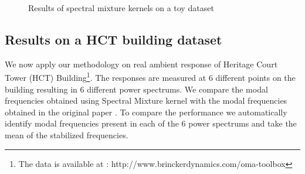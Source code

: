\begin{figure}[!ht]
  \centering
  \quad
    \quad
  
  \caption{Results of spectral mixture kernels on a toy dataset}
\end{figure}

\subsection{Results on a HCT building dataset}
We now apply our methodology on real ambient response of Heritage Court Tower (HCT) Building\footnote{The data is available at : http://www.brinckerdynamics.com/oma-toolbox}. The responses are measured at 6 different points on the building resulting in 6 different power spectrums. We compare the modal frequencies obtained using Spectral Mixture kernel with the modal frequencies obtained in the original paper \cite{brincker2000modal}. To compare the performance we automatically identify modal frequencies present in each of the 6 power spectrums and take the mean of the stabilized frequencies.

